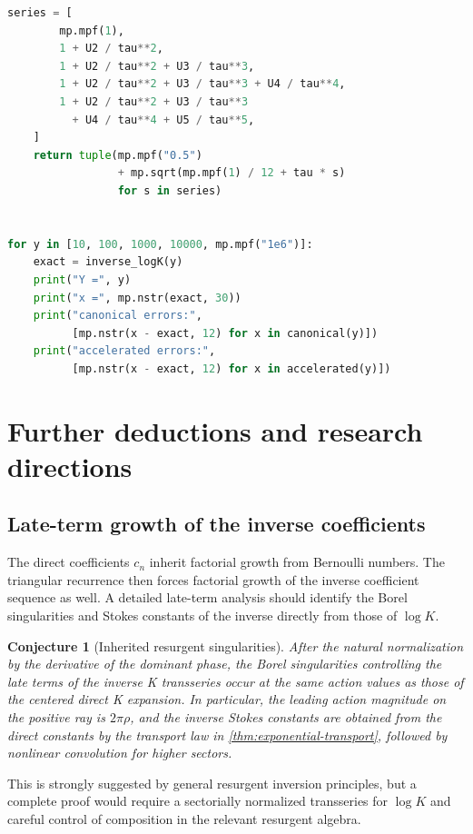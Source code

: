 \documentclass[11pt,a4paper]{article}
\numberwithin{equation}{section}
\newtheorem{conjecture}[theorem]{Conjecture}
\theoremstyle{remark}
\begin{document}
\begin{lstlisting}[language=Python,caption={Numerical verification of the inverse K-function transseries.}]
    series = [
        mp.mpf(1),
        1 + U2 / tau**2,
        1 + U2 / tau**2 + U3 / tau**3,
        1 + U2 / tau**2 + U3 / tau**3 + U4 / tau**4,
        1 + U2 / tau**2 + U3 / tau**3
          + U4 / tau**4 + U5 / tau**5,
    ]
    return tuple(mp.mpf("0.5")
                 + mp.sqrt(mp.mpf(1) / 12 + tau * s)
                 for s in series)


for y in [10, 100, 1000, 10000, mp.mpf("1e6")]:
    exact = inverse_logK(y)
    print("Y =", y)
    print("x =", mp.nstr(exact, 30))
    print("canonical errors:",
          [mp.nstr(x - exact, 12) for x in canonical(y)])
    print("accelerated errors:",
          [mp.nstr(x - exact, 12) for x in accelerated(y)])
\end{lstlisting}

\section{Further deductions and research directions}
\label{sec:future}

\subsection{Late-term growth of the inverse coefficients}

The direct coefficients \(c_n\) inherit factorial growth from Bernoulli
numbers.  The triangular recurrence then forces factorial growth of the
inverse coefficient sequence as well.  A detailed late-term analysis should
identify the Borel singularities and Stokes constants of the inverse directly
from those of \(\log K\).

\begin{conjecture}[Inherited resurgent singularities]
After the natural normalization by the derivative of the dominant phase,
the Borel singularities controlling the late terms of the inverse K
transseries occur at the same action values as those of the centered direct
K expansion.  In particular, the leading action magnitude on the positive
ray is \(2\pi\rho\), and the inverse Stokes constants are obtained from the
direct constants by the transport law in
\cref{thm:exponential-transport}, followed by nonlinear convolution for
higher sectors.
\end{conjecture}

This is strongly suggested by general resurgent inversion principles, but a
complete proof would require a sectorially normalized transseries for
\(\log K\) and careful control of composition in the relevant resurgent
algebra.
\end{document}
